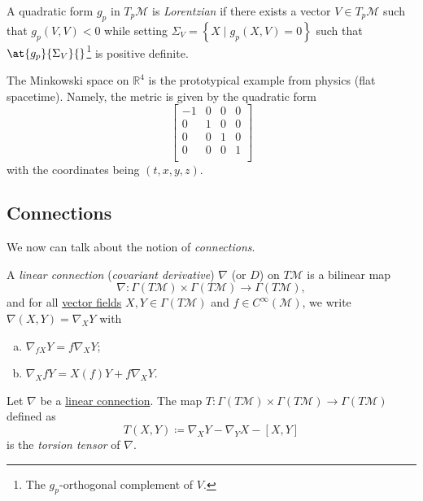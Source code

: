 \begin{definition}[Lorentzian]\label{def:Lorentzian}
	A quadratic form \(g_p\) in \(T_{p} \mathcal{M} \) is \emph{Lorentzian} if there exists a vector \(V\in T_p \mathcal{M} \) such that \(g_p(V, V) < 0\) while setting \(\Sigma _V = \left\{ X \mid g_p(X, V) = 0 \right\}\) such that \(\at{g_p}{\Sigma _V}{} \)\footnote{The \(g_p\)-orthogonal complement of \(V\).} is positive definite.
\end{definition}

\begin{eg}
	The Minkowski space on \(\mathbb{R} ^4\) is the prototypical example from physics (flat spacetime). Namely, the metric is given by the quadratic form
	\[
		\begin{bmatrix}
			-1 & 0 & 0 & 0 \\
			0  & 1 & 0 & 0 \\
			0  & 0 & 1 & 0 \\
			0  & 0 & 0 & 1 \\
		\end{bmatrix}
	\]
	with the coordinates being \((t, x, y, z)\).
\end{eg}

\subsection{Connections}
We now can talk about the notion of \emph{connections}.

\begin{definition}\label{def:linear-connection}
	A \emph{linear connection} (\emph{covariant derivative}) \(\nabla \) (or \(D\)) on \(T\mathcal{M} \) is a bilinear map
	\[
		\nabla \colon \Gamma (T \mathcal{M} ) \times \Gamma (T \mathcal{M} ) \to \Gamma (T \mathcal{M} ),
	\]
	and for all \hyperref[def:vector-field]{vector fields} \(X, Y\in \Gamma (T \mathcal{M} )\) and \(f\in C^{\infty} (\mathcal{M} )\), we write \(\nabla (X, Y) = \nabla _X Y\) with
	\begin{enumerate}[(a)]
		\item \(\nabla _{fX}Y = f \nabla _X Y\);
		\item \(\nabla _X fY = X(f)Y + f \nabla _X Y\).
	\end{enumerate}
\end{definition}

\begin{definition}\label{def:torsion-tensor}
	Let \(\nabla \) be a \hyperref[def:linear-connection]{linear connection}. The map \(T\colon \Gamma (T \mathcal{M} )\times \Gamma (T \mathcal{M} )\to \Gamma (T \mathcal{M} )\) defined as
	\[
		T(X, Y) \coloneqq \nabla _X Y - \nabla _Y X - [X, Y]
	\]
	is the \emph{torsion tensor} of \(\nabla \).
\end{definition}

